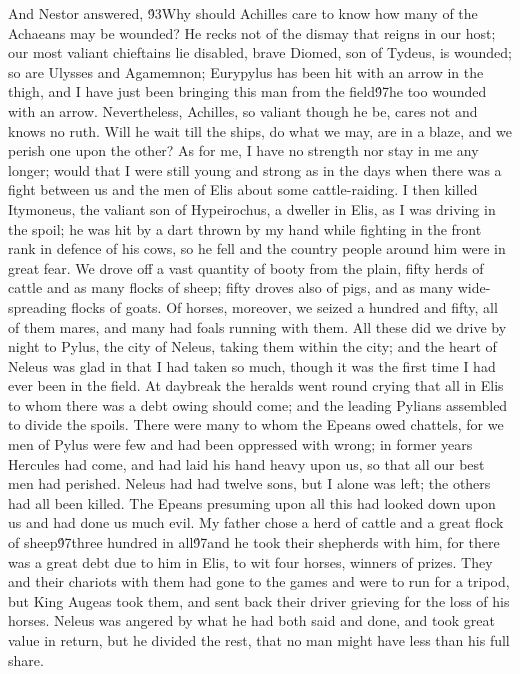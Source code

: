 {And Nestor answered, \'93Why should Achilles care to know how many of the Achaeans may be wounded? He recks not of the dismay that reigns in our host; our most valiant chieftains lie disabled, brave Diomed, son of Tydeus, is wounded; so are Ulysses and Agamemnon; Eurypylus has been hit with an arrow in the thigh, and I have just been bringing this man from the field\'97he too wounded with an arrow. Nevertheless, Achilles, so valiant though he be, cares not and knows no ruth. Will he wait till the ships, do what we may, are in a blaze, and we perish one upon the other? As for me, I have no strength nor stay in me any longer; would that I were still young and strong as in the days when there was a fight between us and the men of Elis about some cattle-raiding. I then killed Itymoneus, the valiant son of Hypeirochus, a dweller in Elis, as I was driving in the spoil; he was hit by a dart thrown by my hand while fighting in the front rank in defence of his cows, so he fell and the country people around him were in great fear. We drove off a vast quantity of booty from the plain, fifty herds of cattle and as many flocks of sheep; fifty droves also of pigs, and as many wide-spreading flocks of goats. Of horses, moreover, we seized a hundred and fifty, all of them mares, and many had foals running with them. All these did we drive by night to Pylus, the city of Neleus, taking them within the city; and the heart of Neleus was glad in that I had taken so much, though it was the first time I had ever been in the field. At daybreak the heralds went round crying that all in Elis to whom there was a debt owing should come; and the leading Pylians assembled to divide the spoils. There were many to whom the Epeans owed chattels, for we men of Pylus were few and had been oppressed with wrong; in former years Hercules had come, and had laid his hand heavy upon us, so that all our best men had perished. Neleus had had twelve sons, but I alone was left; the others had all been killed. The Epeans presuming upon all this had looked down upon us and had done us much evil. My father chose a herd of cattle and a great flock of sheep\'97three hundred in all\'97and he took their shepherds with him, for there was a great debt due to him in Elis, to wit four horses, winners of prizes. They and their chariots with them had gone to the games and were to run for a tripod, but King Augeas took them, and sent back their driver grieving for the loss of his horses. Neleus was angered by what he had both said and done, and took great value in return, but he divided the rest, that no man might have less than his full share.\
}
